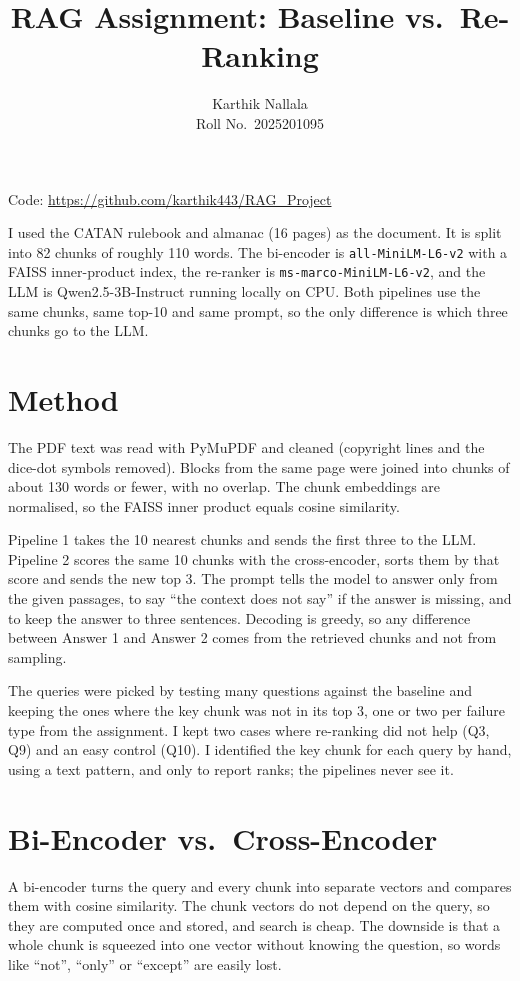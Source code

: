 \documentclass[11pt,a4paper]{article}
\title{RAG Assignment: Baseline vs.\ Re-Ranking}
\author{Karthik Nallala \\ Roll No.\ 2025201095}
\date{}
\begin{document}
\maketitle

Code: \url{https://github.com/karthik443/RAG_Project}

I used the CATAN rulebook and almanac (16 pages) as the document. It is split into 82 chunks of roughly 110 words. The bi-encoder is \texttt{all-MiniLM-L6-v2} with a FAISS inner-product index, the re-ranker is \texttt{ms-marco-MiniLM-L6-v2}, and the LLM is Qwen2.5-3B-Instruct running locally on CPU. Both pipelines use the same chunks, same top-10 and same prompt, so the only difference is which three chunks go to the LLM.

\section{Method}

The PDF text was read with PyMuPDF and cleaned (copyright lines and the dice-dot symbols removed). Blocks from the same page were joined into chunks of about 130 words or fewer, with no overlap. The chunk embeddings are normalised, so the FAISS inner product equals cosine similarity.

Pipeline 1 takes the 10 nearest chunks and sends the first three to the LLM. Pipeline 2 scores the same 10 chunks with the cross-encoder, sorts them by that score and sends the new top 3. The prompt tells the model to answer only from the given passages, to say ``the context does not say'' if the answer is missing, and to keep the answer to three sentences. Decoding is greedy, so any difference between Answer 1 and Answer 2 comes from the retrieved chunks and not from sampling.

The queries were picked by testing many questions against the baseline and keeping the ones where the key chunk was not in its top 3, one or two per failure type from the assignment. I kept two cases where re-ranking did not help (Q3, Q9) and an easy control (Q10). I identified the key chunk for each query by hand, using a text pattern, and only to report ranks; the pipelines never see it.

\section{Bi-Encoder vs.\ Cross-Encoder}

A bi-encoder turns the query and every chunk into separate vectors and compares them with cosine similarity. The chunk vectors do not depend on the query, so they are computed once and stored, and search is cheap. The downside is that a whole chunk is squeezed into one vector without knowing the question, so words like ``not'', ``only'' or ``except'' are easily lost.
\end{document}
